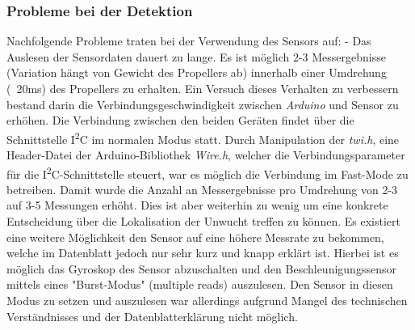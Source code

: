 \subsubsection*{Probleme bei der Detektion}
Nachfolgende Probleme traten bei der Verwendung des Sensors auf:
- Das Auslesen der Sensordaten dauert zu lange. Es ist möglich 2-3 Messergebnisse (Variation hängt von Gewicht des Propellers ab) innerhalb einer Umdrehung (~20ms) des Propellers zu erhalten. Ein Versuch dieses Verhalten zu verbessern bestand darin die Verbindungsgeschwindigkeit zwischen \textit{Arduino} und Sensor zu erhöhen. Die Verbindung zwischen den beiden Geräten findet über die Schnittstelle I\textsuperscript{2}C im normalen Modus statt. Durch Manipulation der \textit{twi.h}, eine Header-Datei der Arduino-Bibliothek \textit{Wire.h}, welcher die Verbindungsparameter für die I\textsuperscript{2}C-Schnittstelle steuert, war es möglich die Verbindung im Fast-Mode zu betreiben. Damit wurde die Anzahl an Messergebnisse pro Umdrehung von 2-3 auf 3-5 Messungen erhöht. Dies ist aber weiterhin zu wenig um eine konkrete Entscheidung über die Lokalisation der Unwucht treffen zu können.
Es existiert eine weitere Möglichkeit den Sensor auf eine höhere Messrate zu bekommen, welche im Datenblatt jedoch nur sehr kurz und knapp erklärt ist. Hierbei ist es möglich das Gyroskop des Sensor abzuschalten und den Beschleunigungssensor mittels eines "Burst-Modus" (multiple reads) auszulesen. Den Sensor in diesen Modus zu setzen und auszulesen war allerdings aufgrund Mangel des technischen Verständnisses und der Datenblatterklärung nicht möglich.
